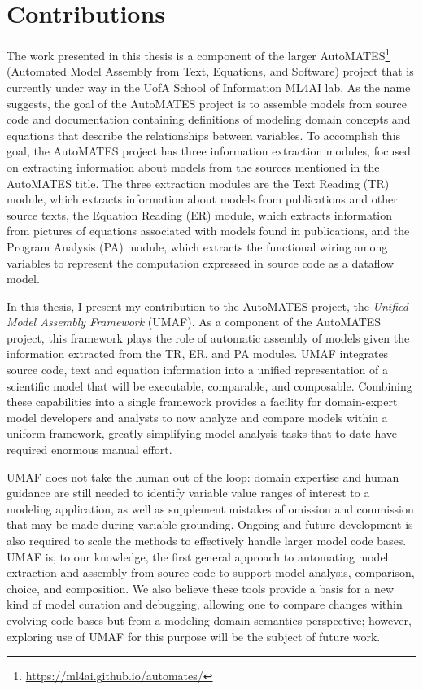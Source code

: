 \section{Contributions\label{sec:contributions}}
The work presented in this thesis is a component of the larger AutoMATES\footnote{\url{https://ml4ai.github.io/automates/}} (Automated Model Assembly from Text, Equations, and Software) project \citep{pyarelal2019} that is currently under way in the UofA School of Information ML4AI lab.
As the name suggests, the goal of the AutoMATES project is to assemble models from source code and documentation containing definitions of modeling domain concepts and equations that describe the relationships between variables.
To accomplish this goal, the AutoMATES project has three information extraction modules, focused on extracting information about models from the sources mentioned in the AutoMATES title.
The three extraction modules are the Text Reading (TR) module, which extracts information about models from publications and other source texts, the Equation Reading (ER) module, which extracts information from pictures of equations associated with models found in publications, and the Program Analysis (PA) module, which extracts the functional wiring among variables to represent the computation expressed in source code as a dataflow model.

In this thesis, I present my contribution to the AutoMATES project, the \emph{Unified Model Assembly Framework} (UMAF).
As a component of the AutoMATES project, this framework plays the role of automatic assembly of models given the information extracted from the TR, ER, and PA modules.
UMAF integrates source code, text and equation information into a unified representation of a scientific model that will be executable, comparable, and composable.
Combining these capabilities into a single framework provides a facility for domain-expert model developers and analysts to now analyze and compare models within a uniform framework, greatly simplifying model analysis tasks that to-date have required enormous manual effort.

UMAF does not take the human out of the loop: domain expertise and human guidance are still needed to identify variable value ranges of interest to a modeling application, as well as supplement mistakes of omission and commission that may be made during variable grounding.
Ongoing and future development is also required to scale the methods to effectively handle larger model code bases.
UMAF is, to our knowledge, the first general approach to automating model extraction and assembly from source code to support model analysis, comparison, choice, and composition.
We also believe these tools provide a basis for a new kind of model curation and debugging, allowing one to compare changes within evolving code bases but from a modeling domain-semantics perspective; however, exploring use of UMAF for this purpose will be the subject of future work.


